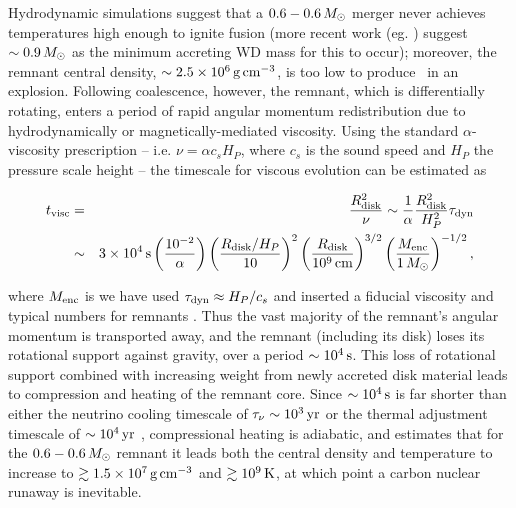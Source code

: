 
Hydrodynamic simulations \citep{loreig09} suggest that a $0.6-0.6\,\Msun$ merger never achieves temperatures high enough to ignite fusion (more recent work (eg. \citep{pakm+11, dan+12}) suggest $\sim0.9\,\Msun$ as the minimum accreting WD mass for this to occur); moreover, the remnant central density, $\sim2.5\times10^6\,\gcc$, is too low to produce \Ni\ in an explosion.  Following coalescence, however, the remnant, which is differentially rotating, enters a period of rapid angular momentum redistribution due to hydrodynamically or magnetically-mediated viscosity.  Using the standard $\alpha$-viscosity prescription \cite{shaks73} -- i.e. $\nu = \alpha c_s H_P$, where $c_s$ is the sound speed and $H_P$ the pressure scale height -- the timescale for viscous evolution can be estimated as

\begin{eqnarray}
t_\mrm{visc} &=& \frac{R_\mrm{disk}^2}{\nu} \sim \frac{1}{\alpha}\frac{R_\mrm{disk}^2}{H_P^2}\taudyn \nonumber \\
			&\sim& 3\times10^4\,\mrm{s}\left(\frac{10^{-2}}{\alpha}\right)\left(\frac{R_\mrm{disk}/H_P}{10}\right)^2\left(\frac{R_\mrm{disk}}{10^9\,\mrm{cm}}\right)^{3/2}\left(\frac{M_\mrm{enc}}{1\,\Msun}\right)^{-1/2},
\end{eqnarray}

\noindent where $M_\mathrm{enc}$ is we have used $\taudyn \approx H_P/c_s$ and inserted a fiducial viscosity and typical numbers for remnants \citep{shen+12}.  Thus the vast majority of the remnant's angular momentum is transported away, and the remnant (including its disk) loses its rotational support against gravity, over a period $\sim10^4\,\mathrm{s}$.  This loss of rotational support combined with increasing weight from newly accreted disk material leads to compression and heating of the remnant core.  Since $\sim10^4\,\mathrm{s}$ is far shorter than either the neutrino cooling timescale of $\taunu \sim 10^3\,\mrm{yr}$ or the thermal adjustment timescale of $\sim10^4\,\mathrm{yr}$ \citep{shen+12}, compressional heating is adiabatic, and \citeal{vkercj10} estimates that for the $0.6-0.6\,\Msun$ remnant it leads both the central density and temperature to increase to $\gtrsim1.5\times10^7\,\gcc$ and $\gtrsim10^9\,\mathrm{K}$, at which point a carbon nuclear runaway is inevitable.

